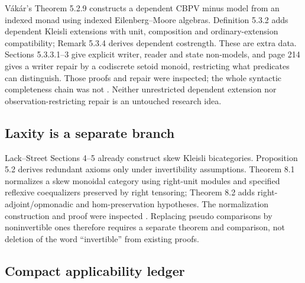 \documentclass[11pt,a4paper]{article}
\begin{document}
V\'ak\'ar's Theorem 5.2.9 constructs a dependent CBPV minus model from an indexed
monad using indexed Eilenberg--Moore algebras. Definition 5.3.2 adds dependent
Kleisli extensions with unit, composition and ordinary-extension compatibility;
Remark 5.3.4 derives dependent costrength. These are extra data. Sections
5.3.3.1--3 give explicit writer, reader and state non-models, and page 214 gives
a writer repair by a codiscrete setoid monoid, restricting what predicates can
distinguish. Those proofs and repair were inspected; the whole syntactic
completeness chain was not \cite{Vakar}. Neither unrestricted dependent
extension nor observation-restricting repair is an untouched research idea.

\subsection{Laxity is a separate branch}

Lack--Street Sections 4--5 already construct skew Kleisli bicategories.
Proposition 5.2 derives redundant axioms only under invertibility assumptions.
Theorem 8.1 normalizes a skew monoidal category using right-unit modules and
specified reflexive coequalizers preserved by right tensoring; Theorem 8.2
adds right-adjoint/opmonadic and hom-preservation hypotheses. The normalization
construction and proof were inspected \cite{LS}. Replacing pseudo comparisons
by noninvertible ones therefore requires a separate theorem and comparison,
not deletion of the word ``invertible'' from existing proofs.

\subsection{Compact applicability ledger}
\end{document}
